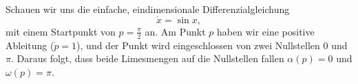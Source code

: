 \begin{beispiel} \label{poinbendix:beispiel:1dlimesmengen}
Schauen wir uns die einfache, eindimensionale Differenzialgleichung
\begin{equation*}
    \dot{x} = \sin x,
\end{equation*}
mit einem Startpunkt von $p = \frac{\pi}{2}$ an.
Am Punkt $p$ haben wir eine positive Ableitung ($\dot{p} = 1$), und der Punkt wird eingeschlossen von zwei Nullstellen $0$ und $\pi$.
Daraus folgt, dass beide Limesmengen auf die Nullstellen fallen $\alpha(p) = 0$ und $\omega(p) = \pi$.
\end{beispiel}
